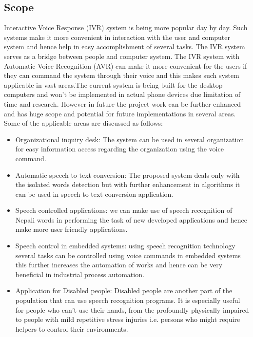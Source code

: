 \subsection{Scope}
Interactive Voice Response (IVR) system is being more popular day by day. Such systems make it more convenient in interaction with the user and computer system and hence help in easy accomplishment of several tasks. The IVR system serves as a bridge between people and computer system. The IVR system with Automatic Voice Recognition (AVR) can make it more convenient for the users if they can command the system through their voice and this makes such system applicable in vast areas.The current system is being built for the desktop computers and won't be implemented in actual phone devices due limitation of time and research. However in future the project work can be further enhanced and has huge scope and potential for future implementations in several areas. Some of the applicable areas are discussed as follows:
\begin{itemize}
	\item Organizational inquiry desk: The system can be used in several organization for easy information access regarding the organization using the voice command.
	\item Automatic speech to text conversion: The proposed system deals only with the isolated words detection but with further enhancement in algorithms it can be used in speech to text conversion application.
	\item Speech controlled applications: we can make use of speech recognition of Nepali words in performing the task of new developed applications and hence make more user friendly applications.
	\item Speech control in embedded systems: using speech recognition technology several tasks can be controlled using voice commands in embedded systems this further increases the automation of works and hence can be very beneficial in industrial process automation.
	\item Application for Disabled people: Disabled people are another part of the population that can use speech recognition programs. It is especially useful for people who can't use their hands, from the profoundly physically impaired to people with mild repetitive stress injuries i.e. persons who might require helpers to control their environments.
\end{itemize}

